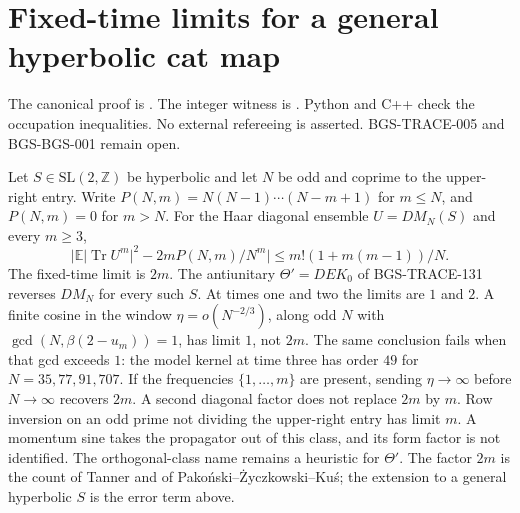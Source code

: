 \section{Fixed-time limits for a general hyperbolic cat map}
\label{sec:hyperbolic-short-time-limit}
The canonical proof is
.
The integer witness is
.
Python and C++ check the occupation inequalities.
No external refereeing is asserted.
BGS-TRACE-005 and BGS-BGS-001 remain open.


\begin{theorem}
\label{thm:hyperbolic-short-time-limit}
Let \(S\in\mathrm{SL}(2,\mathbb Z)\) be hyperbolic and let \(N\) be odd and coprime
to the upper-right entry. Write \(P(N,m)=N(N-1)\cdots(N-m+1)\) for \(m\le N\),
and \(P(N,m)=0\) for \(m>N\). For the Haar diagonal ensemble \(U=DM_N(S)\) and
every \(m\ge 3\),
\[
\bigl\lvert\mathbb E\lvert\operatorname{Tr} U^m\rvert^2-2m P(N,m)/N^m\bigr\rvert
\le m!(1+m(m-1))/N.
\]
The fixed-time limit is \(2m\). The antiunitary \(\Theta'=DEK_0\) of
BGS-TRACE-131 reverses \(DM_N\) for every such \(S\). At times one and two the
limits are \(1\) and \(2\). A finite cosine in the window
\(\eta=o(N^{-2/3})\), along odd \(N\) with \(\gcd(N,\beta(2-u_m))=1\), has
limit \(1\), not \(2m\). The same conclusion fails when that gcd exceeds \(1\):
the model kernel at time three has order \(49\) for \(N=35,77,91,707\). If the
frequencies \(\{1,\ldots,m\}\) are present, sending \(\eta\to\infty\) before
\(N\to\infty\) recovers \(2m\). A second diagonal factor does not replace \(2m\)
by \(m\). Row inversion on an odd prime not dividing the upper-right entry has
limit \(m\). A momentum sine takes the propagator out of this class, and its
form factor is not identified. The orthogonal-class name remains a heuristic
for \(\Theta'\). The factor \(2m\) is the count of Tanner and of
Pako\'nski--\.Zyczkowski--Ku\'s; the extension to a general hyperbolic \(S\)
is the error term above.
\end{theorem}
